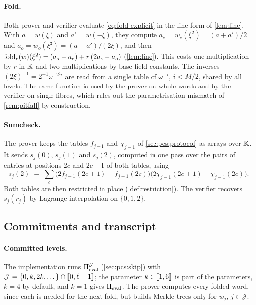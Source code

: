 \paragraph{Fold.}
Both prover and verifier evaluate \eqref{eq:fold-explicit} in the line form of \cref{lem:line}.
With $a = w(\xi)$ and $a' = w(-\xi)$, they compute $a_e = w_e(\xi^2) = (a+a')/2$ and $a_o = w_o(\xi^2) = (a-a')/(2\xi)$, and then $\mathrm{fold}_r(w)(\xi^2) = (a_o - a_e) + r\,(2a_e - a_o)$ (\cref{lem:line}).
This costs one multiplication by $r$ in $\mathbb{K}$ and two multiplications by base-field constants.
The inverses $(2\xi)^{-1} = 2^{-1}\omega^{-2^j i}$ are read from a single table of $\omega^{-i}$, $i < M/2$, shared by all levels.
The same function is used by the prover on whole words and by the verifier on single fibres, which rules out the parametrisation mismatch of \cref{rem:pitfall} by construction.

\paragraph{Sumcheck.}
The prover keeps the tables $f_{j-1}$ and $\chi_{j-1}$ of \cref{sec:pcs:protocol} as arrays over $\mathbb{K}$.
It sends $s_j(0)$, $s_j(1)$ and $s_j(2)$, computed in one pass over the pairs of entries at positions $2c$ and $2c+1$ of both tables, using
\[
  s_j(2) \;=\; \sum_{c} \bigl(2f_{j-1}(2c+1) - f_{j-1}(2c)\bigr)\bigl(2\chi_{j-1}(2c+1) - \chi_{j-1}(2c)\bigr).
\]
Both tables are then restricted in place (\cref{def:restriction}).
The verifier recovers $s_j(r_j)$ by Lagrange interpolation on $\{0,1,2\}$.

\subsection{Commitments and transcript}\label{sec:impl:merkle}

\paragraph{Committed levels.}
The implementation runs $\Pi_{\mathrm{eval}}^{\mathcal{J}}$ (\cref{sec:pcs:skip}) with $\mathcal{J} = \{0, k, 2k, \dots\} \cap \llbracket 0, \ell-1 \rrbracket$; the parameter $k \in \llbracket 1, 6 \rrbracket$ is part of the parameters, $k = 4$ by default, and $k = 1$ gives $\Pi_{\mathrm{eval}}$.
The prover computes every folded word, since each is needed for the next fold, but builds Merkle trees only for $w_j$, $j \in \mathcal{J}$.

